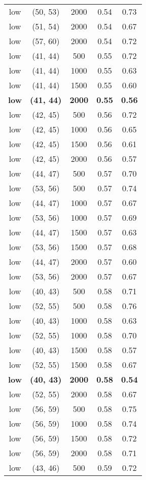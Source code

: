 \begin{tabular}{c c c c c}
low & (50, 53) &  2000 & 0.54 & 0.73 \\
low & (51, 54) &  2000 & 0.54 & 0.67 \\
low & (57, 60) &  2000 & 0.54 & 0.72 \\
low & (41, 44) &  500 & 0.55 & 0.72 \\
low & (41, 44) &  1000 & 0.55 & 0.63 \\
low & (41, 44) &  1500 & 0.55 & 0.60 \\
\textbf{low} & \textbf{(41, 44)} & \textbf{ 2000} & \textbf{0.55} & \textbf{0.56} \\
low & (42, 45) &  500 & 0.56 & 0.72 \\
low & (42, 45) &  1000 & 0.56 & 0.65 \\
low & (42, 45) &  1500 & 0.56 & 0.61 \\
low & (42, 45) &  2000 & 0.56 & 0.57 \\
low & (44, 47) &  500 & 0.57 & 0.70 \\
low & (53, 56) &  500 & 0.57 & 0.74 \\
low & (44, 47) &  1000 & 0.57 & 0.67 \\
low & (53, 56) &  1000 & 0.57 & 0.69 \\
low & (44, 47) &  1500 & 0.57 & 0.63 \\
low & (53, 56) &  1500 & 0.57 & 0.68 \\
low & (44, 47) &  2000 & 0.57 & 0.60 \\
low & (53, 56) &  2000 & 0.57 & 0.67 \\
low & (40, 43) &  500 & 0.58 & 0.71 \\
low & (52, 55) &  500 & 0.58 & 0.76 \\
low & (40, 43) &  1000 & 0.58 & 0.63 \\
low & (52, 55) &  1000 & 0.58 & 0.70 \\
low & (40, 43) &  1500 & 0.58 & 0.57 \\
low & (52, 55) &  1500 & 0.58 & 0.67 \\
\textbf{low} & \textbf{(40, 43)} & \textbf{ 2000} & \textbf{0.58} & \textbf{0.54} \\
low & (52, 55) &  2000 & 0.58 & 0.67 \\
low & (56, 59) &  500 & 0.58 & 0.75 \\
low & (56, 59) &  1000 & 0.58 & 0.74 \\
low & (56, 59) &  1500 & 0.58 & 0.72 \\
low & (56, 59) &  2000 & 0.58 & 0.71 \\
low & (43, 46) &  500 & 0.59 & 0.72 \\

\end{tabular}
